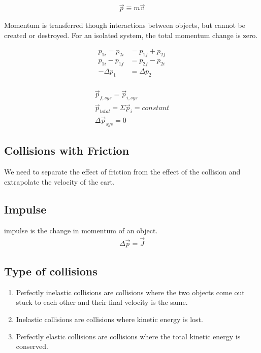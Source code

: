 \documentclass{article}
\theoremstyle{mytheoremstyle}
\theoremstyle{mytheoremstyle}
\theoremstyle{myproblemstyle}
\begin{document}
    \begin{align*}
        \vec{p} \equiv m \vec{v}
    \end{align*}

    Momentum is transferred though interactions between objects, but cannot be
    created or destroyed. For an isolated system, the total momentum change is
    zero.

    \begin{align*}
        p_{1i} = p_{2i} &= p_{1f} + p_{2f} \\
        p_{1i} - p_{1f} &= p_{2f} - p_{2i} \\
        -\Delta p_1     &= \Delta p_2 \\
    \end{align*}

    \begin{align*}
        \vec{p}_{f,sys} = \vec{p}_{i,sys} \\
        \vec{p}_{total} = \Sigma \vec{p}_i = constant \\
        \Delta \vec{p}_{sys} = 0
    \end{align*}

    \subsection*{Collisions with Friction}
    We need to separate the effect of friction from the effect of the collision
    and extrapolate the velocity of the cart.

    \subsection*{Impulse}
    impulse is the change in momentum of an object.
    \begin{align*}
        \Delta \vec{p} = \vec{J}
    \end{align*}

    \subsection*{Type of collisions}
    \begin{enumerate}
        \item Perfectly inelastic collisions are collisions where the two
            objects come out stuck to each other and their final velocity is the
            same.

        \item Inelastic collisions are collisions where kinetic energy is lost.

        \item Perfectly elastic collisions are collisions where the total
            kinetic energy is conserved.
    \end{enumerate}
\end{document}
